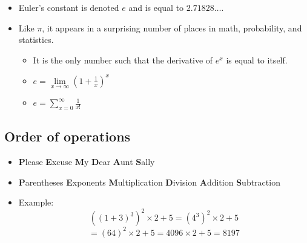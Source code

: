 \documentclass[20pt]{extarticle}
\newcommand{\bi}{\begin{itemize}}
\newcommand{\ei}{\end{itemize}}
\newcommand{\llim}{\lim\limits}
\begin{document}
\bi
\item Euler's constant is denoted $e$ and is equal to
  $2.71828\ldots$.
\item Like $\pi$, it appears in a surprising number of places in math,
  probability, and statistics.
\bi
\item It is the only number such that the derivative of $e^x$ is equal
  to itself.
\item $e = \llim_{x\to \infty} (1+\frac{1}{x})^x$
\item $e = \sum_{x=0}^\infty\frac{1}{x!}$
\ei
\ei

\subsection{Order of operations}
\bi
\item \textbf{P}lease \textbf{E}xcuse \textbf{M}y \textbf{D}ear \textbf{A}unt \textbf{S}ally 
\item \textbf{P}arentheses \textbf{E}xponents \textbf{M}ultiplication
  \textbf{D}ivision \textbf{A}ddition \textbf{S}ubtraction
\item Example:  $$((1+3)^3)^2 \times 2 + 5 = (4^3)^2 \times 2 + 5$$
$$ =  (64)^2 \times 2 + 5 = 4096  \times 2 + 5 = 8197$$
\ei
\end{document}
